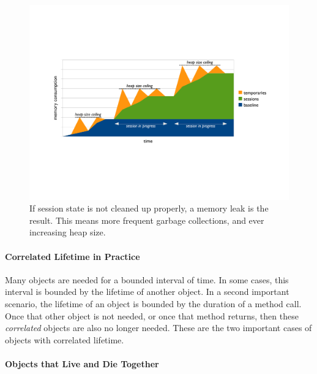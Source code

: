 \begin{figure}[h]  %
	\centering
	\includegraphics[width=\textwidth]{part4/Figures/lifetime/timeline-base-session-temps-with-leak}
	\caption{If session state is not cleaned up
	properly, a memory leak is the result. This means more frequent garbage
	collections, and ever increasing heap size.}
	\label{fig:timeline-base-session-temps-with-leak}
\end{figure}


\paragraph{Correlated Lifetime in Practice}

Many objects are needed for a bounded interval of time. In some cases, this
interval is bounded by the lifetime of another object. In a second important
scenario, the lifetime of an object is bounded by the duration of a method call.
Once that other object is not needed, or once that method returns, then these
\emph{correlated} objects are also no longer needed. These are the two important
cases of objects with correlated lifetime.

\paragraph{Objects that Live and Die Together}
\label{sec:correlated-lifetime-1}

